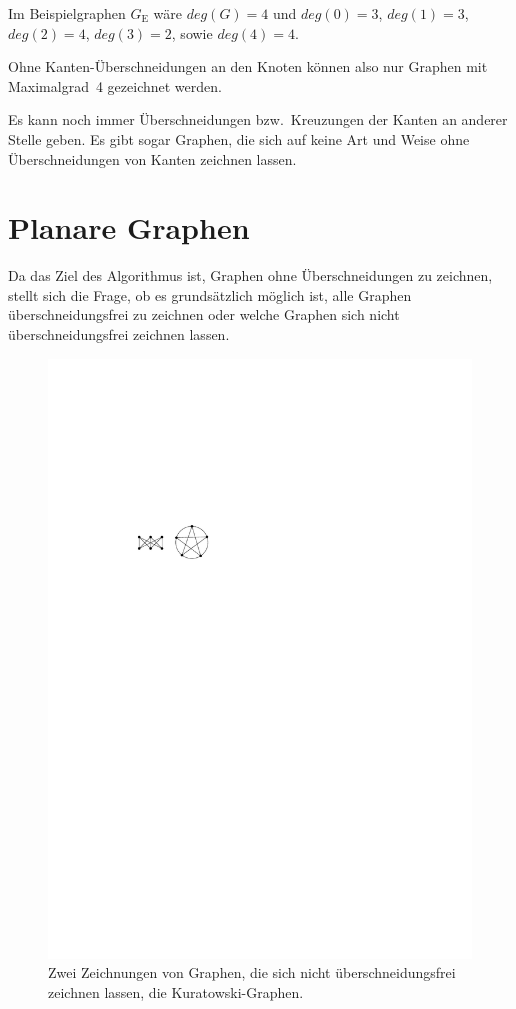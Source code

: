 \documentclass[a4paper]{scrreprt}
\theoremstyle{definition}
\begin{document}
Im Beispielgraphen $G_\text{E}$ wäre $deg(G) = 4$ und $deg(0) = 3$, $deg(1) = 3$, $deg(2) = 4$, $deg(3) = 2$, sowie $deg(4) = 4$.

Ohne Kanten-Überschneidungen an den Knoten können also nur Graphen mit Maximalgrad~4 gezeichnet werden. 

Es kann noch immer Überschneidungen bzw.\ Kreuzungen der Kanten an anderer Stelle geben. Es gibt sogar Graphen, die sich auf keine Art und Weise ohne Überschneidungen von Kanten zeichnen lassen.


\section{Planare Graphen}

Da das Ziel des Algorithmus ist, Graphen ohne Überschneidungen zu zeichnen, stellt sich die Frage, ob es grundsätzlich möglich ist, alle Graphen überschneidungsfrei zu zeichnen oder welche Graphen sich nicht überschneidungsfrei zeichnen lassen.

\begin{figure}[h]
  \centering
  \includegraphics{nonplanar}
  \caption{Zwei Zeichnungen von Graphen, die sich nicht überschneidungsfrei zeichnen lassen, die Kuratowski-Graphen.}
  \label{fig:nonplanar}
\end{figure}
\end{document}
